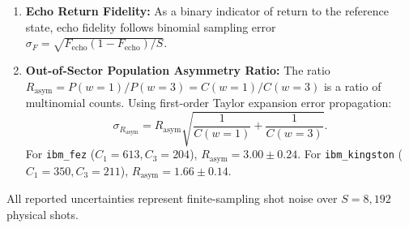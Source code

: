 \documentclass[aps,pra,reprint,superscriptaddress,floatfix,nofootinbib]{revtex4-2}
\begin{document}
\begin{enumerate}
    \item \textbf{Echo Return Fidelity:} As a binary indicator of return to the reference state, echo fidelity follows binomial sampling error $\sigma_{F} = \sqrt{F_{\text{echo}}(1 - F_{\text{echo}})/S}$.
    
    \item \textbf{Out-of-Sector Population Asymmetry Ratio:} The ratio $R_{\text{asym}} = P(w=1)/P(w=3) = C(w=1)/C(w=3)$ is a ratio of multinomial counts. Using first-order Taylor expansion error propagation:
    \begin{equation}
    \sigma_{R_{\text{asym}}} = R_{\text{asym}} \sqrt{\frac{1}{C(w=1)} + \frac{1}{C(w=3)}}.
    \end{equation}
    For \texttt{ibm\_fez} ($C_1 = 613, C_3 = 204$), $R_{\text{asym}} = 3.00 \pm 0.24$. For \texttt{ibm\_kingston} ($C_1 = 350, C_3 = 211$), $R_{\text{asym}} = 1.66 \pm 0.14$.
\end{enumerate}
All reported uncertainties represent finite-sampling shot noise over $S = 8,192$ physical shots.
\end{document}
